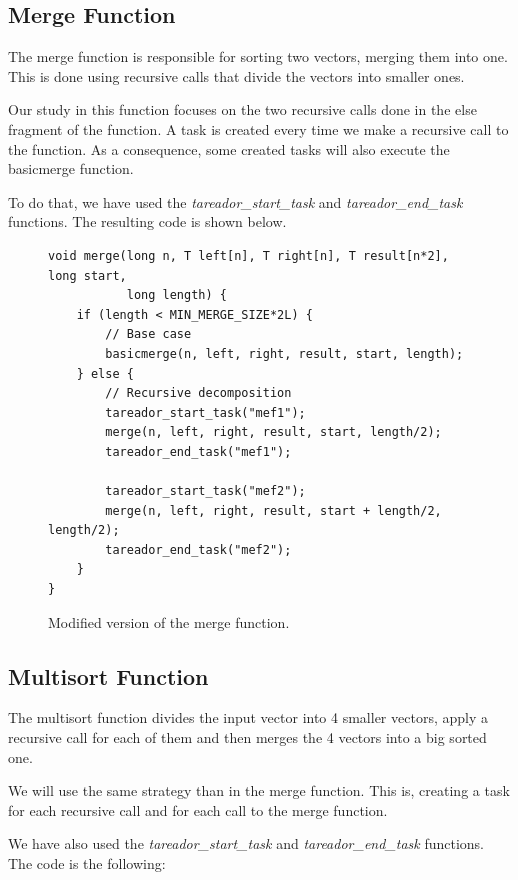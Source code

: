 \documentclass[12pt, a4paper]{article}
\begin{document}
\subsection{Merge Function}

The merge function is responsible for sorting two vectors, merging them into one. This is done using recursive calls that divide the vectors into smaller ones.

Our study in this function focuses on the two recursive calls done in the else fragment of the function. A task is created every time we make a recursive call to the function. As a consequence, some created tasks will also execute the basicmerge function.

To do that, we have used the \textit{tareador\_start\_task} and \textit{tareador\_end\_task} functions. The resulting code is shown below.

\begin{figure}[H]
\begin{lstlisting}
void merge(long n, T left[n], T right[n], T result[n*2], long start,
		   long length) {
    if (length < MIN_MERGE_SIZE*2L) {
        // Base case
        basicmerge(n, left, right, result, start, length);
    } else {
        // Recursive decomposition
        tareador_start_task("mef1");
        merge(n, left, right, result, start, length/2);
        tareador_end_task("mef1");

        tareador_start_task("mef2");
        merge(n, left, right, result, start + length/2, length/2);
        tareador_end_task("mef2");
    }
}
\end{lstlisting}

\label{code:merge_tareador}
\caption{Modified version of the merge function.}
\end{figure}


\subsection{Multisort Function}

The multisort function divides the input vector into 4 smaller vectors, apply a recursive call for each of them and then merges the 4 vectors into a big sorted one.

We will use the same strategy than in the merge function. This is, creating a task for each recursive call and for each call to the merge function.

We have also used the \textit{tareador\_start\_task} and \textit{tareador\_end\_task} functions. The code is the following:
\end{document}
